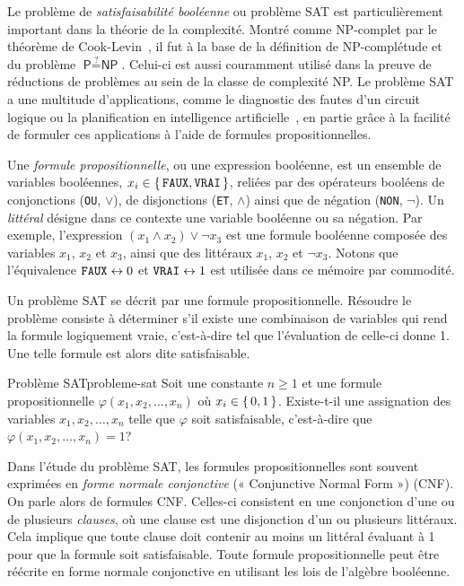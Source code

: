 Le problème de \textit{satisfaisabilité booléenne} ou problème SAT est particulièrement important dans la théorie de la complexité. Montré comme \textsf{NP}-complet par le théorème de Cook-Levin~\cite{cookComplexityTheoremprovingProcedures1971,levinUniversalSequentialSearch}, il fut à la base de la définition de \textsf{NP}-complétude et du problème $\textsf{P} \stackrel{?}{=} \textsf{NP}$. Celui-ci est aussi couramment utilisé dans la preuve de réductions de problèmes au sein de la classe de complexité \textsf
{NP}. Le problème SAT a une multitude d'applications, comme le diagnostic des fautes d'un circuit logique ou la planification en intelligence artificielle~\cite{marques-silvaPracticalApplicationsBoolean2008}, en partie grâce à la facilité de formuler ces applications à l'aide de formules propositionnelles.

Une \textit{formule propositionnelle}, ou une expression booléenne, est un ensemble de variables booléennes, $x_{i} \in \set{\textsc{\texttt{FAUX}}, \textsc{\texttt{VRAI}}}$, reliées par des opérateurs booléens de conjonctions (\textsc{\texttt{OU}}, $\lor$), de disjonctions (\textsc{\texttt{ET}}, $\land$) ainsi que de négation (\textsc{\texttt{NON}}, $\neg$).  Un \textit{littéral} désigne dans ce contexte une variable booléenne ou sa négation. Par exemple, l'expression $(x_{1} \land x_{2}) \lor \neg x_{3}$ est une formule booléenne composée des variables $x_{1}$, $x_{2}$ et $x_{3}$, ainsi que des littéraux $x_{1}$, $x_{2}$ et $\neg x_{3}$. Notons que l'équivalence $\textsc{\texttt{FAUX}} \leftrightarrow 0$ et $\textsc{\texttt{VRAI}} \leftrightarrow 1$ est utilisée dans ce mémoire par commodité.

Un problème SAT se décrit par une formule propositionnelle. Résoudre le problème consiste à déterminer s'il existe une combinaison de variables qui rend la formule logiquement vraie, c'est-à-dire tel que l'évaluation de celle-ci donne 1. Une telle formule est alors dite satisfaisable.

\begin{maindefinition}{Problème SAT}{probleme-sat}
    Soit une constante $n \geq 1$ et une formule propositionnelle $\varphi(x_{1}, x_{2}, \dots, x_{n})$ où $x_{i} \in \set{ 0, 1 }$.  Existe-t-il une assignation des variables $x_{1}, x_{2}, \dots, x_{n}$ telle que $\varphi$ soit satisfaisable, c'est-à-dire que $\varphi(x_{1}, x_{2}, \dots, x_{n})=1$?
\end{maindefinition}

Dans l'étude du problème SAT, les formules propositionnelles sont souvent exprimées en \textit{forme normale conjonctive} (« Conjunctive Normal Form ») (CNF). On parle alors de formules CNF. Celles-ci consistent en une conjonction d'une ou de plusieurs \textit{clauses}, où une clause est une disjonction d'un ou plusieurs littéraux. Cela implique que toute clause doit contenir au moins un littéral évaluant à 1 pour que la formule soit satisfaisable. Toute formule propositionnelle peut être réécrite en forme normale conjonctive en utilisant les lois de l'algèbre booléenne.

